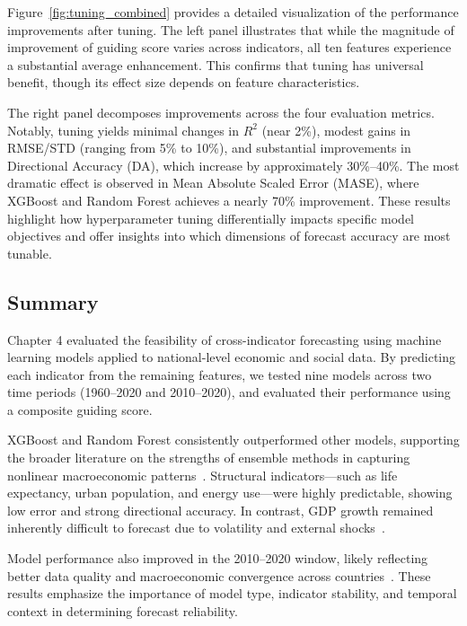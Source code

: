 \documentclass[12pt]{article}
\begin{document}
Figure~\ref{fig:tuning_combined} provides a detailed visualization of the performance improvements after tuning. The left panel illustrates that while the magnitude of improvement of guiding score varies across indicators, all ten features experience a substantial average enhancement. This confirms that tuning has universal benefit, though its effect size depends on feature characteristics.

The right panel decomposes improvements across the four evaluation metrics. Notably, tuning yields minimal changes in $R^2$ (near 2\%), modest gains in RMSE/STD (ranging from 5\% to 10\%), and substantial improvements in Directional Accuracy (DA), which increase by approximately 30\%--40\%. The most dramatic effect is observed in Mean Absolute Scaled Error (MASE), where XGBoost and Random Forest achieves a nearly 70\% improvement. 
These results highlight how hyperparameter tuning differentially impacts specific model objectives and offer insights into which dimensions of forecast accuracy are most tunable.

\subsection{Summary}

Chapter 4 evaluated the feasibility of cross-indicator forecasting using machine learning models applied to national-level economic and social data. By predicting each indicator from the remaining features, we tested nine models across two time periods (1960–2020 and 2010–2020), and evaluated their performance using a composite guiding score.

XGBoost and Random Forest consistently outperformed other models, supporting the broader literature on the strengths of ensemble methods in capturing nonlinear macroeconomic patterns~\cite{Mullainathan2017ML, Athey2019ML}. Structural indicators—such as life expectancy, urban population, and energy use—were highly predictable, showing low error and strong directional accuracy. In contrast, GDP growth remained inherently difficult to forecast due to volatility and external shocks~\cite{Loungani2001, ClementsHendry2002}.

Model performance also improved in the 2010–2020 window, likely reflecting better data quality and macroeconomic convergence across countries~\cite{Baldwin2016Great, Jerven2013Poor}. These results emphasize the importance of model type, indicator stability, and temporal context in determining forecast reliability.
\end{document}

